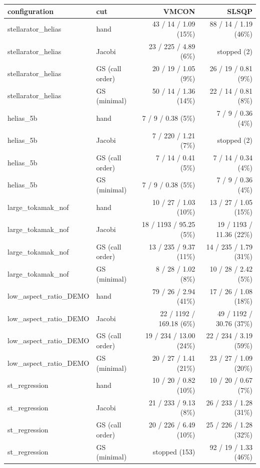 \begin{tabular}{llrr}
\toprule
configuration & cut & VMCON & SLSQP \\
\midrule
stellarator\_helias & hand & 43 / 14 / 1.09 (15\%) & 88 / 14 / 1.19 (46\%) \\
stellarator\_helias & Jacobi & 23 / 225 / 4.89 (6\%) & stopped (2) \\
stellarator\_helias & GS (call order) & 20 / 19 / 1.05 (9\%) & 26 / 19 / 0.81 (9\%) \\
stellarator\_helias & GS (minimal) & 50 / 14 / 1.36 (14\%) & 22 / 14 / 0.81 (8\%) \\
helias\_5b & hand & 7 / 9 / 0.38 (5\%) & 7 / 9 / 0.36 (4\%) \\
helias\_5b & Jacobi & 7 / 220 / 1.21 (7\%) & stopped (2) \\
helias\_5b & GS (call order) & 7 / 14 / 0.41 (5\%) & 7 / 14 / 0.34 (4\%) \\
helias\_5b & GS (minimal) & 7 / 9 / 0.38 (5\%) & 7 / 9 / 0.36 (4\%) \\
large\_tokamak\_nof & hand & 10 / 27 / 1.03 (10\%) & 13 / 27 / 1.05 (15\%) \\
large\_tokamak\_nof & Jacobi & 18 / 1193 / 95.25 (5\%) & 19 / 1193 / 11.36 (22\%) \\
large\_tokamak\_nof & GS (call order) & 13 / 235 / 9.37 (11\%) & 14 / 235 / 1.79 (31\%) \\
large\_tokamak\_nof & GS (minimal) & 8 / 28 / 1.02 (8\%) & 10 / 28 / 2.42 (5\%) \\
low\_aspect\_ratio\_DEMO & hand & 79 / 26 / 2.94 (41\%) & 17 / 26 / 1.08 (18\%) \\
low\_aspect\_ratio\_DEMO & Jacobi & 22 / 1192 / 169.18 (6\%) & 49 / 1192 / 30.76 (37\%) \\
low\_aspect\_ratio\_DEMO & GS (call order) & 19 / 234 / 13.00 (24\%) & 22 / 234 / 3.19 (59\%) \\
low\_aspect\_ratio\_DEMO & GS (minimal) & 20 / 27 / 1.41 (21\%) & 23 / 27 / 1.09 (20\%) \\
st\_regression & hand & 10 / 20 / 0.82 (10\%) & 10 / 20 / 0.67 (7\%) \\
st\_regression & Jacobi & 21 / 233 / 9.13 (8\%) & 26 / 233 / 1.28 (31\%) \\
st\_regression & GS (call order) & 20 / 226 / 6.49 (10\%) & 25 / 226 / 1.28 (32\%) \\
st\_regression & GS (minimal) & stopped (153) & 92 / 19 / 1.33 (46\%) \\
\bottomrule
\end{tabular}
